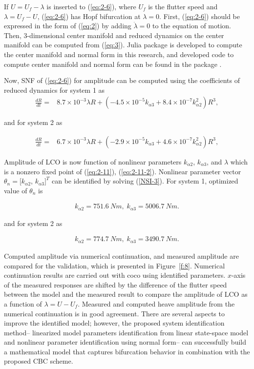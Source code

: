 \documentclass[openacc]{rsproca_new}%
\theoremstyle{own}
\newcommand{\Eref}[1]{(\ref{#1})}
\newcommand{\Fref}[1]{Figure~\ref{#1}}
\begin{document}
If $U=U_f-\lambda$ is inserted to \Eref{eq:2-6}, where $U_f$ is the flutter speed and $\lambda=U_f-U$, \Eref{eq:2-6} has Hopf bifurcation at $\lambda=0$. First, \Eref{eq:2-6} should be expressed in the form of \Eref{eq:2} by adding $\dot \lambda=0$ to the equation of motion. Then, 3-dimensional center manifold and reduced dynamics on the center manifold can be computed from \Eref{eq:3}. Julia \cite{bezanson2017julia} package is developed to compute the center manifold and normal form in this research, and developed code to compute center manifold and normal form can be found in the package \cite{hopfNF}.

Now, SNF of \Eref{eq:2-6} for amplitude can be computed using the coefficients of reduced dynamics for system 1 as
\begin{align}\label{eq:2-11}
\frac{dR}{dt}=&8.7\times 10^{-3}\lambda R+(- 4.5 \times 10^{-5}  k_{\alpha 3} + 8.4 \times 10^{-7} k_{\alpha 2}^2)R^3,
\end{align}

\noindent and for system 2 as

\begin{align}\label{eq:2-11-2}
\frac{dR}{dt}=&6.7\times 10^{-3}\lambda R+(- 2.9 \times 10^{-5}  k_{\alpha 3} + 4.6 \times 10^{-7} k_{\alpha 2}^2)R^3,
\end{align}

\noindent Amplitude of LCO is now function of nonlinear parameters $k_{\alpha2}$, $k_{\alpha3}$, and $\lambda$ which is a nonzero fixed point of \Eref{eq:2-11}, \Eref{eq:2-11-2}. Nonlinear parameter vector $\theta_n=[k_{\alpha2}$, $k_{\alpha3}]^T$ can be identified by solving \Eref{NSI-3}. For system 1, optimized value of $\theta_n$ is

\begin{align}\label{eq:2-15}
k_{\alpha2}=751.6 \: Nm, \; k_{\alpha3}=5006.7 \: Nm.
\end{align}

\noindent and for system 2 as

\begin{align}\label{eq:2-15-2}
k_{\alpha2}=774.7 \: Nm, \; k_{\alpha3}=3490.7 \: Nm.
\end{align}

Computed amplitude via numerical continuation, and measured amplitude are compared for the validation, which is presented in \Fref{f:8}. Numerical continuation results are carried out with coco \cite{dankowicz2013recipes} using identified parameters. $x$-axis of the measured responses are shifted by the difference of the flutter speed between the model and the measured result to compare the amplitude of LCO as a function of $\lambda=U-U_f$. Measured and computed heave amplitude from the numerical continuation is in good agreement. There are several aspects to improve the identified model; however, the proposed system identification method-- linearized model parameters identification from linear state-space model and nonlinear parameter identification using normal form-- can successfully build a mathematical model that captures bifurcation behavior in combination with the proposed CBC scheme.
\end{document}
